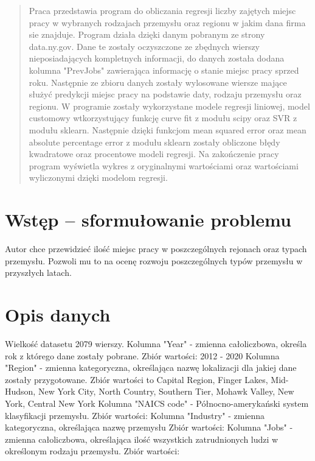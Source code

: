 \documentclass[10pt]{article}
\begin{document}


\begin{abstract}

Praca przedstawia program do obliczania regresji liczby zajętych miejsc pracy w wybranych rodzajach przemysłu oraz regionu w jakim dana firma sie znajduje. Program działa dzięki danym pobranym ze strony data.ny.gov.
Dane te zostały oczyszczone ze zbędnych wierszy nieposiadających kompletnych informacji, do danych została dodana kolumna "PrevJobs" zawierająca informację o stanie miejsc pracy sprzed roku. Następnie ze zbioru danych zostały wylosowane wiersze mające służyć predykcji miejsc pracy na podstawie daty, rodzaju przemysłu oraz regionu. W programie zostały wykorzystane modele regresji liniowej, model customowy wtkorzystujący funkcję curve fit z modułu scipy oraz SVR z modułu sklearn. Następnie dzięki funkcjom mean squared error oraz mean absolute percentage error z modułu sklearn zostały obliczone błędy kwadratowe oraz procentowe modeli regresji. Na zakończenie pracy program wyświetla wykres z oryginalnymi wartościami oraz wartościami wyliczonymi dzięki modelom regresji. 

\end{abstract}

\section{Wstęp -- sformułowanie problemu}
\label{sec:wstep}

Autor chce przewidzieć ilość miejsc pracy w poszczególnych rejonach oraz typach przemysłu. Pozwoli mu to na ocenę rozwoju poszczególnych typów przemysłu w przyszłych latach.

\section{Opis danych}

Wielkość datasetu 2079 wierszy.
    Kolumna "Year" - zmienna całoliczbowa, określa rok z którego dane zostały pobrane. Zbiór wartości: 2012 - 2020
    Kolumna "Region" - zmienna kategoryczna, określająca nazwę lokalizacji dla jakiej dane zostały przygotowane. Zbiór wartości to Capital Region, Finger Lakes, Mid-Hudson, New York City, North Country, Southern Tier, Mohawk Valley, New York, Central New York
    Kolumna "NAICS code" - Północno-amerykański system klasyfikacji przemysłu. Zbiór wartości: 
    Kolumna "Industry" - zmienna kategoryczna, określająca nazwę przemysłu Zbiór wartości:
    Kolumna "Jobs" - zmienna całoliczbowa, określająca ilość wszystkich zatrudnionych ludzi w określonym rodzaju przemysłu. Zbiór wartości: 
    
\end{document}
